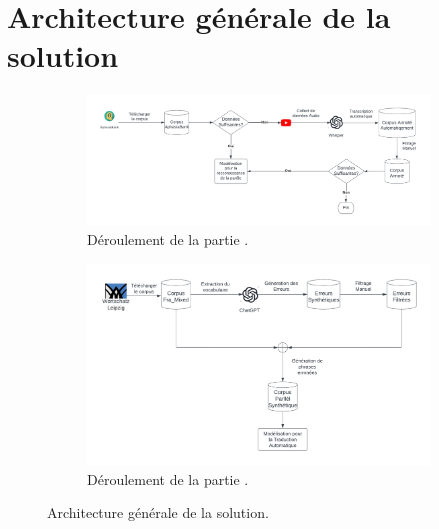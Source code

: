 \section{Architecture générale de la solution}

\begin{figure}[hbt]
    \begin{subfigure}{\textwidth}
        \begin{center}
            \includegraphics[width=\linewidth]{assets/pdf/ASR.pdf}
        \end{center}
        \caption{Déroulement de la partie .}
        \label{fig.asr-archi}
    \end{subfigure}
    \begin{subfigure}{\textwidth}
        \begin{center}
            \includegraphics[width=\linewidth]{assets/pdf/NMT.pdf}
        \end{center}
        \caption{Déroulement de la partie .}
        \label{fig.nmt-archi}
    \end{subfigure}
    \caption{Architecture générale de la solution.}
    \label{fig.archi} 
\end{figure}


